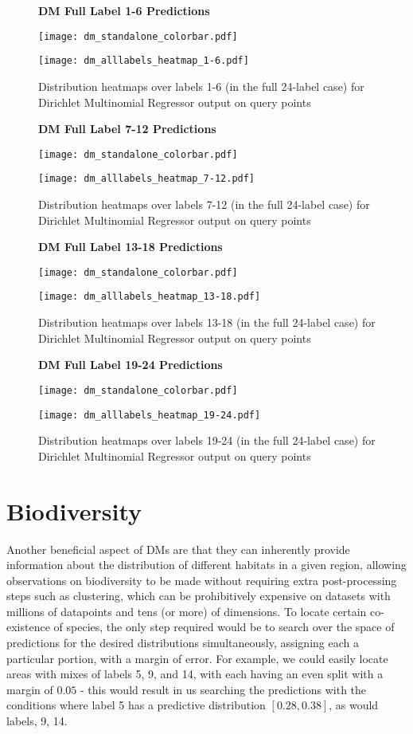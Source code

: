 \begin{figure}[H]
    \textbf{DM Full Label 1-6 Predictions}
    \centerline{\texttt{[image: dm\_standalone\_colorbar.pdf]}}
    \centerline{\texttt{[image: dm\_alllabels\_heatmap\_1-6.pdf]}}
    \caption{Distribution heatmaps over labels 1-6 (in the full 24-label case) for Dirichlet Multinomial Regressor output on query points}
    \label{fig:dm_24-1_label_heatmap}
    \hfill
\end{figure}
\begin{figure}[H]
    \textbf{DM Full Label 7-12 Predictions}
    \centerline{\texttt{[image: dm\_standalone\_colorbar.pdf]}}
    \centerline{\texttt{[image: dm\_alllabels\_heatmap\_7-12.pdf]}}
    \caption{Distribution heatmaps over labels 7-12 (in the full 24-label case) for Dirichlet Multinomial Regressor output on query points}
    \label{fig:dm_24-2_label_heatmap}
    \hfill
\end{figure}
\begin{figure}[H]
    \textbf{DM Full Label 13-18 Predictions}
    \centerline{\texttt{[image: dm\_standalone\_colorbar.pdf]}}
    \centerline{\texttt{[image: dm\_alllabels\_heatmap\_13-18.pdf]}}
    \caption{Distribution heatmaps over labels 13-18 (in the full 24-label case) for Dirichlet Multinomial Regressor output on query points}
    \label{fig:dm_24-3_label_heatmap}
    \hfill
\end{figure}
\begin{figure}[H]
    \textbf{DM Full Label 19-24 Predictions}
    \centerline{\texttt{[image: dm\_standalone\_colorbar.pdf]}}
    \centerline{\texttt{[image: dm\_alllabels\_heatmap\_19-24.pdf]}}
    \caption{Distribution heatmaps over labels 19-24 (in the full 24-label case) for Dirichlet Multinomial Regressor output on query points}
    \label{fig:dm_24-4_label_heatmap}
    \hfill
\end{figure}

\section{Biodiversity}

Another beneficial aspect of DMs are that they can inherently provide information about the distribution of different habitats in a given region, allowing observations on biodiversity to be made without requiring extra post-processing steps such as clustering, which can be prohibitively expensive on datasets with millions of datapoints and tens (or more) of dimensions. To locate certain co-existence of species, the only step required would be to search over the space of predictions for the desired distributions simultaneously, assigning each a particular portion, with a margin of error. For example, we could easily locate areas with mixes of  labels 5, 9, and 14, with each having an even split with a margin of $0.05$ - this would result in us searching the predictions with the conditions where label 5 has a predictive distribution $[0.28, 0.38]$, as would labels, 9, 14. 

